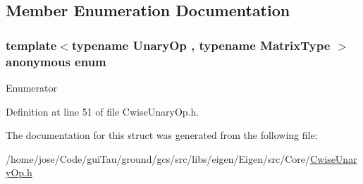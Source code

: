 \subsection{Member Enumeration Documentation}
\hypertarget{structei__traits_3_01_cwise_unary_op_3_01_unary_op_00_01_matrix_type_01_4_01_4_a4cc48d92f5da40371900184ef7fcac6b}{\subsubsection[{anonymous enum}]{\setlength{\rightskip}{0pt plus 5cm}template$<$typename Unary\-Op , typename Matrix\-Type $>$ anonymous enum}}\label{structei__traits_3_01_cwise_unary_op_3_01_unary_op_00_01_matrix_type_01_4_01_4_a4cc48d92f5da40371900184ef7fcac6b}
\begin{Desc}
\item[Enumerator]\par
\begin{description}
\item[{\em 
\hypertarget{structei__traits_3_01_cwise_unary_op_3_01_unary_op_00_01_matrix_type_01_4_01_4_a4cc48d92f5da40371900184ef7fcac6ba673bc648c37944d2781cd1db6cdba165}{Flags}\label{structei__traits_3_01_cwise_unary_op_3_01_unary_op_00_01_matrix_type_01_4_01_4_a4cc48d92f5da40371900184ef7fcac6ba673bc648c37944d2781cd1db6cdba165}
}]\item[{\em 
\hypertarget{structei__traits_3_01_cwise_unary_op_3_01_unary_op_00_01_matrix_type_01_4_01_4_a4cc48d92f5da40371900184ef7fcac6ba9ef3844c337eadfb1876b721cd541004}{Coeff\-Read\-Cost}\label{structei__traits_3_01_cwise_unary_op_3_01_unary_op_00_01_matrix_type_01_4_01_4_a4cc48d92f5da40371900184ef7fcac6ba9ef3844c337eadfb1876b721cd541004}
}]\end{description}
\end{Desc}


Definition at line 51 of file Cwise\-Unary\-Op.\-h.



The documentation for this struct was generated from the following file\-:\begin{DoxyCompactItemize}
\item 
/home/jose/\-Code/gui\-Tau/ground/gcs/src/libs/eigen/\-Eigen/src/\-Core/\hyperlink{_cwise_unary_op_8h}{Cwise\-Unary\-Op.\-h}\end{DoxyCompactItemize}
